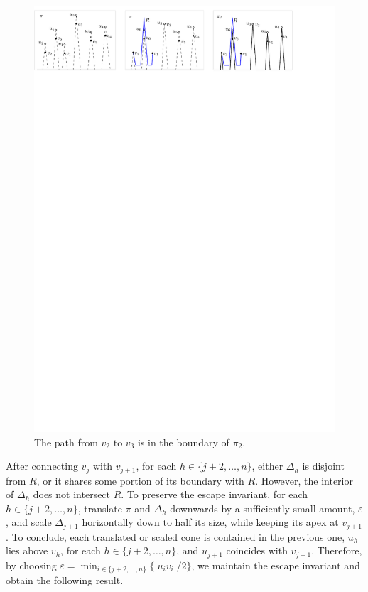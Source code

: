 \documentclass[11pt]{patmorin}
\begin{document}
\begin{figure}[tb]
\centering
\includegraphics[width=.98\textwidth]{img/DentedHalfspace.pdf}
\caption{The path from $v_2$ to $v_3$ is in the boundary of $\pi_2$.}
\label{fig:Dented Halfspace}
\end{figure}

After connecting $v_j$ with $v_{j+1}$, for each $h\in\{j{+}2,\ldots,n\}$, either $\Delta_h$ is disjoint from $R$, or it shares some portion of its boundary with $R$. However, the interior of $\Delta_h$ does not intersect $R$.
To preserve the escape invariant, for each $h\in\{j{+}2,\ldots,n\}$, translate $\pi$ and $\Delta_h$ downwards by a sufficiently small amount, $\varepsilon$, and scale $\Delta_{j+1}$ horizontally down to half its size, while keeping its apex at $v_{j+1}$. To conclude, each translated or scaled cone is contained in the previous one, $u_h$ lies above $v_h$, for each $h\in\{j+2,\ldots,n\}$, and $u_{j+1}$ coincides with $v_{j+1}$. Therefore, by choosing $\varepsilon = \min_{i\in \{j +2,\ldots,n\}}\{|u_iv_i|/2\}$, we maintain the escape invariant and obtain the following result.
\end{document}
